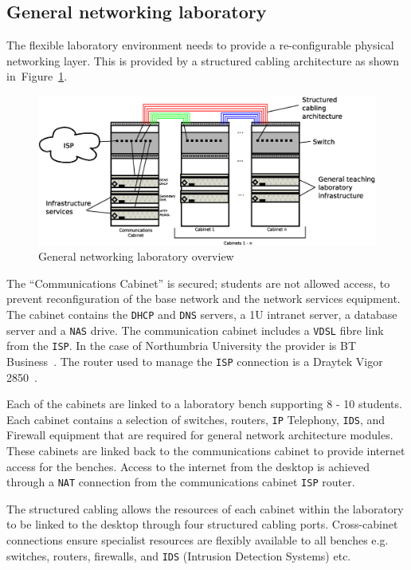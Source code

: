\subsection{General networking laboratory}
The flexible laboratory environment needs to provide a re-configurable physical networking layer. This is provided by a structured cabling architecture as shown in~Figure~\ref{fig:Overview1}. 

\begin{figure}[h]
\begin{center}
	\includegraphics[scale=0.4]{Images/Infrastructure.eps}
\caption{General networking laboratory overview}
\label{fig:Overview1}
\end{center}
\end{figure}

The ``Communications Cabinet'' is secured; students are not allowed access, to prevent reconfiguration of the base network and the network services equipment. The cabinet contains the \texttt{DHCP} and \texttt{DNS} servers, a 1U intranet server, a database server and a \texttt{NAS} drive. The communication cabinet includes a \texttt{VDSL} fibre link from the \texttt{ISP}. In the case of Northumbria University the provider is BT Business~\cite{BT:17}. The router used to manage the \texttt{ISP} connection is a Draytek Vigor 2850~\cite{DC:17}.

Each of the cabinets are linked to a laboratory bench supporting 8 - 10 students. Each cabinet contains a selection of switches, routers, \texttt{IP} Telephony, \texttt{IDS}, and Firewall equipment that are required for general network architecture modules. These cabinets are linked back to the communications cabinet to provide internet access for the benches. Access to the internet from the desktop is achieved through a \texttt{NAT} connection from the communications cabinet \texttt{ISP} router. 

The structured cabling allows the resources of each cabinet within the laboratory to be linked to the desktop through four structured cabling ports. Cross-cabinet connections ensure specialist resources are flexibly available to all benches e.g. switches, routers, firewalls, and \texttt{IDS} (Intrusion Detection Systems) etc.

